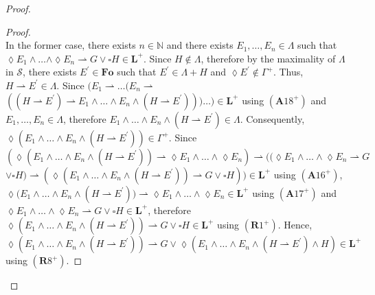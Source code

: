 \documentclass[10pt,a4paper]{amsart}
\def\Fo{\mathbf{Fo}}
\def\Formula{\mathbf{A}}
\def\L{\mathbf{L}}
\def\N{\mathbb{N}}
\def\Rule{\mathbf{R}}
\begin{document}
\begin{proof}
\begin{proof}
\\
%
%
In the former case, there exists $n{\in}\N$ and there exists $E_{1},\ldots,E_{n}{\in}\Lambda$ such that ${\lozenge}E_{1}{\wedge}\ldots
%
%
%
%
%
%
%
$\linebreak$
%
%
%
%
%
%
{\wedge}{\lozenge}E_{n}{\rightharpoonup}G{\vee}{\square}H{\in}\L^{+}$.
Since $H{\not\in}\Lambda$, therefore by the maximality of $\Lambda$ in ${\mathcal S}$, there exists $E^{\prime}{\in}\Fo$ such that $E^{\prime}{\in}\Lambda{+}H$ and ${\lozenge}E^{\prime}{\not\in}\Gamma^{+}$.
Thus, $H{\rightharpoonup}E^{\prime}{\in}\Lambda$.
Since $(E_{1}{\rightharpoonup}\ldots(E_{n}{\rightharpoonup}
%
%
%
%
%
%
%
$\linebreak$
%
%
%
%
%
%
((H{\rightharpoonup}E^{\prime}){\rightharpoonup}E_{1}{\wedge}\ldots{\wedge}E_{n}{\wedge}(H{\rightharpoonup}E^{\prime})))\ldots){\in}\L^{+}$ using $(\Formula18^{+})$ and $E_{1},\ldots,E_{n}{\in}\Lambda$,
%
%
%
%
%
%
%
\linebreak
%
%
%
%
%
%
therefore $E_{1}{\wedge}\ldots{\wedge}E_{n}{\wedge}(H{\rightharpoonup}E^{\prime}){\in}\Lambda$.
Consequently, ${\lozenge}(E_{1}{\wedge}\ldots{\wedge}E_{n}{\wedge}(H{\rightharpoonup}E^{\prime})){\in}
%
%
%
%
%
%
%
$\linebreak$
%
%
%
%
%
%
\Gamma^{+}$.
Since $({\lozenge}(E_{1}{\wedge}\ldots{\wedge}E_{n}{\wedge}(H{\rightharpoonup}E^{\prime})){\rightharpoonup}{\lozenge}E_{1}{\wedge}\ldots{\wedge}{\lozenge}E_{n}){\rightharpoonup}(({\lozenge}E_{1}{\wedge}\ldots{\wedge}{\lozenge}E_{n}{\rightharpoonup}G
%
%
%
%
%
%
%
$\linebreak$
%
%
%
%
%
%
{\vee}{\square}H){\rightharpoonup}({\lozenge}(E_{1}{\wedge}\ldots{\wedge}E_{n}{\wedge}(H{\rightharpoonup}E^{\prime})){\rightharpoonup}G{\vee}{\square}H)){\in}\L^{+}$ using $(\Formula16^{+})$, ${\lozenge}(E_{1}{\wedge}\ldots{\wedge}
%
%
%
%
%
%
%
$\linebreak$
%
%
%
%
%
%
E_{n}{\wedge}(H{\rightharpoonup}E^{\prime})){\rightharpoonup}{\lozenge}E_{1}{\wedge}\ldots{\wedge}{\lozenge}E_{n}{\in}\L^{+}$ using $(\Formula17^{+})$ and ${\lozenge}E_{1}{\wedge}\ldots{\wedge}{\lozenge}E_{n}{\rightharpoonup}G{\vee}{\square}H
%
%
%
%
%
%
%
$\linebreak$
%
%
%
%
%
%
{\in}\L^{+}$, therefore ${\lozenge}(E_{1}{\wedge}\ldots{\wedge}E_{n}{\wedge}(H{\rightharpoonup}E^{\prime})){\rightharpoonup}G{\vee}{\square}H{\in}\L^{+}$ using $(\Rule1^{+})$.
Hence,
%
%
%
%
%
%
%
\linebreak$
%
%
%
%
%
%
{\lozenge}(E_{1}{\wedge}\ldots{\wedge}E_{n}{\wedge}(H{\rightharpoonup}E^{\prime})){\rightharpoonup}G{\vee}{\lozenge}(E_{1}{\wedge}\ldots{\wedge}E_{n}{\wedge}(H{\rightharpoonup}E^{\prime}){\wedge}H){\in}\L^{+}$ using $(\Rule8^{+})$.

\end{proof}
\end{proof}
\end{document}
